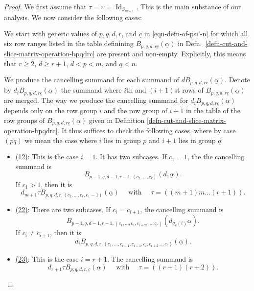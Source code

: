 \documentclass[10pt,a4paper]{amsart}
\DeclareMathOperator{\id}{Id}
\begin{document}
\begin{proof}
We first assume that $\tau = \upsilon = \id_{S_{m+1}}$. This is the
main substance of our analysis. We now consider the following cases: 


We start with generic values of $p, q, d, r$, and $\underline{c}$
in \eqref{eqn-defn-of-psi'-n} for which all six row
ranges listed in the table definining $B_{p, q, d, r
\underline{c}}(\underline{\alpha})$ in
Defn.~\ref{defn-cut-and-slice-matrix-operation-bpqdrc} are present and
non-empty. Explicitly, this means that $r \geq 2$, $d \geq r+1$, 
$d < p < m$, and $q < n$. 

We produce the cancelling summand for each summand of
$d B_{p, q, d, r \underline{c}}(\underline{\alpha})$. 
Denote by $d_i B_{p, q, d, r \underline{c}}(\underline{\alpha})$
the summand where $i$th and $(i+1)$st rows of
$B_{p, q, d, r \underline{c}}(\underline{\alpha})$ are merged.  
The way we produce the cancelling summand for 
$d_i B_{p, q, d, r \underline{c}}(\underline{\alpha})$
depends only on the row group $i$ and the row group of $i+1$ 
in the table of the row groups of 
$B_{p, q, d, r \underline{c}}(\underline{\alpha})$
given in Definition
\ref{defn-cut-and-slice-matrix-operation-bpqdrc}. 
It thus suffices to check the following cases, where by
case $(pq)$ we mean the case where $i$ lies in group $p$
and $i+1$ lies in group $q$:
\begin{itemize}
\item \underline{(12)}: This is the case $i = 1$. It has  
two subcases. If $c_1 = 1$, the 
the cancelling summand is  
$$B_{p-1, q, d-1, r-1,(c_2, \dots, c_r)}(d_1 \underline{\alpha}).$$
If $c_1 > 1$, then it is 
$$
d_{m+1} \tau B_{p, q, d, r, (c_2, \dots, c_r, c_1 - 1)}(\underline{\alpha})
\quad \text{ with } \quad \tau = \left((m+1)m\dots(r+1)\right).$$

\item \underline{(22)}: There are two subcases. If $c_i =
c_{i+1}$, the cancelling summand is 
$$B_{p-1, q, d-1, r-1,(c_1, \dots, c_{i}, c_{i+2}, \dots,
c_r)}(d_{\sigma_{\underline{c}}(i)} \underline{\alpha}).$$ 
If $c_i \neq c_{i+1}$, then it is 
$$d_{i} B_{p, q, d, r,(c_1, \dots, c_{i-1},
c_{i+1}, c_{i}, c_{i+2} \dots, c_r)} (\underline{\alpha}).$$ 

\item \underline{(23)}: This is the case $i = r+1$. 
The cancelling summand is 
$$ d_{r+1} \tau B_{p, q, d, r,\underline{c}} (\underline{\alpha})
\quad \text{ with } \quad \tau = \left((r+1)(r+2)\right). $$


\end{itemize}
\end{proof}
\end{document}
